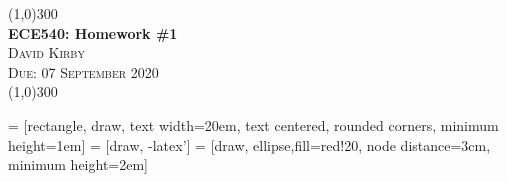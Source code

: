 \documentclass[12pt]{article}
\begin{document}
 	\begin{center}
    \line(1,0){300}\\[0.25cm]
 	\Large{\bfseries ECE540: Homework \#1}\\
 	\textsc{\large David Kirby}\\
 	\textsc{\large Due: 07 September 2020}\\
 	\line(1,0){300}\\[0.75cm]
 	\end{center}

 = [rectangle, draw,
    text width=20em, text centered, rounded corners, minimum height=1em]
 = [draw, -latex']
 = [draw, ellipse,fill=red!20, node distance=3cm,
    minimum height=2em]
\end{document}
